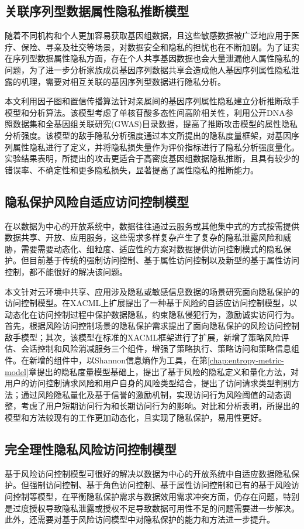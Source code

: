 \subsection{关联序列型数据属性隐私推断模型}

随着不同机构和个人更加容易获取基因组数据，且这些敏感数据被广泛地应用于医疗、保险、寻亲及社交等场景，对数据安全和隐私的担忧也在不断加剧。为了证实在序列型数据属性隐私方面，存在个人共享基因数据也会大量泄漏他人属性隐私的问题，为了进一步分析家族成员基因序列数据共享会造成他人基因序列属性隐私泄露的机理，需要对相互关联的基因序列型数据进行隐私分析。

本文利用因子图和置信传播算法针对亲属间的基因序列属性隐私建立分析推断敌手模型和分析算法。该模型考虑了单核苷酸多态性间高阶相关性，利用公开DNA参照数据集和全基因组关联研究(GWAS)目录数据，提高了推断攻击模型的属性隐私分析强度。该模型的敌手隐私分析强度通过本文所提出的隐私度量框架，对基因序列属性隐私进行了定义，并将隐私损失量作为评价指标进行了隐私分析强度量化。实验结果表明，所提出的攻击更适合于高密度基因组数据隐私推断，且具有较少的错误率、不确定性和更多隐私损失，显著提高了属性隐私的推断能力。

\subsection{隐私保护风险自适应访问控制模型}
在以数据为中心的开放系统中，数据往往通过云服务或其他集中式的方式按需提供数据共享、开放、应用服务，这些需求多样复杂产生了复杂的隐私泄露风险和威胁，需要需要动态化、细粒度、适应性的方案对数据提供访问控制模式的隐私保护。但目前基于传统的强制访问控制、基于属性访问控制以及新型的基于属性访问控制，都不能很好的解决该问题。

本文针对云环境中共享、应用涉及隐私或敏感信息数据的场景研究面向隐私保护的访问控制模型。在XACML上扩展提出了一种基于风险的自适应访问控制模型，以动态化在访问控制过程中保护数据隐私，约束隐私侵犯行为，激励诚实访问行为。首先，根据风险访问控制场景的隐私保护需求提出了面向隐私保护的风险访问控制敌手模型；其次，该模型在标准的XACML框架进行了扩展，新增了策略风险评估、会话控制和风险消减服务三个组件，增强了策略执行、策略访问和策略信息组件。在新增的组件中，以Shannon信息熵作为工具，在第\ref{chap:entropy-metric-model}章提出的隐私度量模型基础上，提出了基于风险的隐私定义和量化方法，对用户的访问控制请求风险和用户自身的风险类型结合，提出了访问请求类型判别方法；通过风险隐私量化及基于信誉的激励机制，实现访问行为风险阈值的动态调整，考虑了用户短期访问行为和长期访问行为的影响。对比和分析表明，所提出的模型和方法较现有的工作更加动态化，且实现了隐私保护，易用性更好。
\subsection{完全理性隐私风险访问控制模型}
基于风险访问控制模型可很好的解决以数据为中心的开放系统中自适应数据隐私保护。但强制访问控制、基于角色访问控制、基于属性访问控制和已有的基于风险访问控制等模型，在平衡隐私保护需求与数据效用需求冲突方面，仍存在问题，特别是过度授权导致隐私泄露或授权不足导致数据可用性不足的问题需要进一步解决。此外，还需要对基于风险访问模型中对隐私保护的能力和方法进一步提升。

